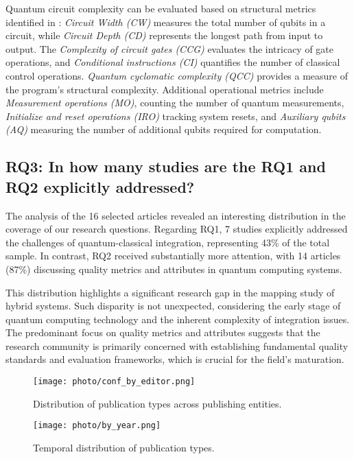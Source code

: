 Quantum circuit complexity can be evaluated based on structural metrics identified in \cite{Díaz_Alvarado-Valiente_Romero-Álvarez_Moguel_Garcia-Alonso_Rodríguez_García-Rodríguez_Murillo_2025}: \textit{Circuit Width (CW)} measures the total number of qubits in a circuit, while \textit{Circuit Depth (CD)} represents the longest path from input to output. The \textit{Complexity of circuit gates (CCG)} evaluates the intricacy of gate operations, and \textit{Conditional instructions (CI)} quantifies the number of classical control operations. \textit{Quantum cyclomatic complexity (QCC)} provides a measure of the program's structural complexity. Additional operational metrics include \textit{Measurement operations (MO)}, counting the number of quantum measurements, \textit{Initialize and reset operations (IRO)} tracking system resets, and \textit{Auxiliary qubits (AQ)} measuring the number of additional qubits required for computation.

\subsection{RQ3: In how many studies are the RQ1 and RQ2 explicitly addressed?}

The analysis of the 16 selected articles revealed an interesting distribution in the coverage of our research questions. Regarding RQ1, 7 studies explicitly addressed the challenges of quantum-classical integration, representing 43\% of the total sample. In contrast, RQ2 received substantially more attention, with 14 articles (87\%) discussing quality metrics and attributes in quantum computing systems.

This distribution highlights a significant research gap in the mapping study of hybrid systems. Such disparity is not unexpected, considering the early stage of quantum computing technology and the inherent complexity of integration issues. The predominant focus on quality metrics and attributes suggests that the research community is primarily concerned with establishing fundamental quality standards and evaluation frameworks, which is crucial for the field's maturation.

\begin{figure}
\begin{center}
\begin{minipage}{0.48\textwidth}
    \texttt{[image: photo/conf\_by\_editor.png]}
    \caption{Distribution of publication types across publishing entities.}
    \label{fig:studies_type_per_year}
\end{minipage}
\hfill
\begin{minipage}{0.48\textwidth}
    \texttt{[image: photo/by\_year.png]}
    \caption{Temporal distribution of publication types.}
    \label{fig:studie_type_per_year}
\end{minipage}
\end{center}
\end{figure}

